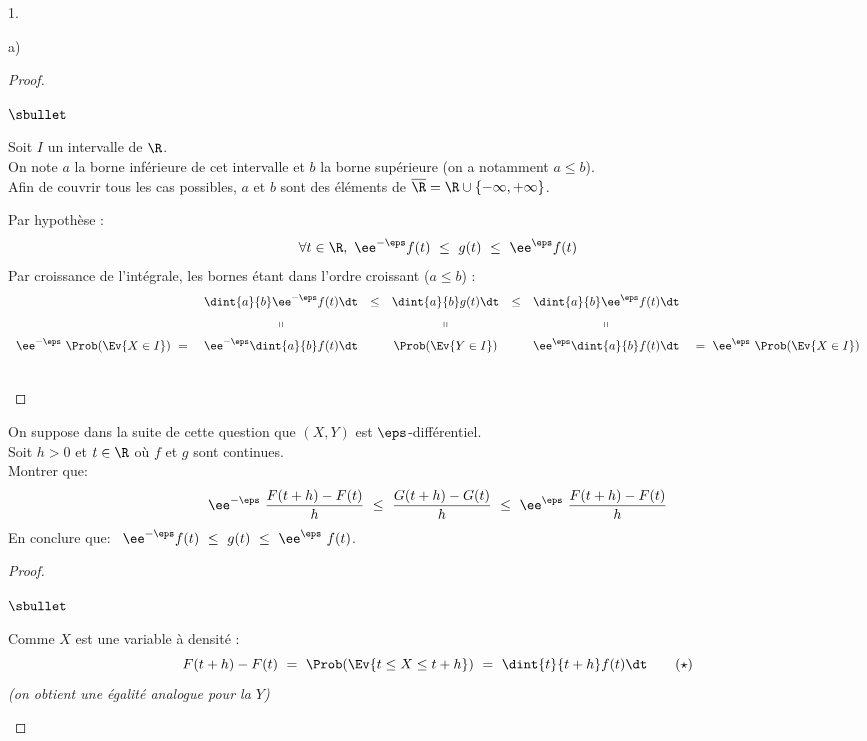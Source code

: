\documentclass[11pt]{article}%
\begin{document}
\begin{noliste}{1.}
\begin{noliste}{a)}
    \begin{proof}~%
      \begin{noliste}{$\sbullet$}
      \item Soit $I$ un intervalle de $\R$.\\
        On note $a$ la borne inférieure de cet intervalle et $b$ la
        borne supérieure (on a notamment $a \leq b$).\\
        Afin de couvrir tous les cas possibles, $a$ et $b$ sont des
        éléments de $\overline{\R} = \R \cup \{-\infty, +\infty\}$.
        
        
        
        

      \item Par hypothèse : 
        \[
        \forall t \in \R, \ \ee^{-\eps} f(t) \ \leq \ g(t) \ \leq \
        \ee^{\eps}f(t)
        \]
        Par croissance de l'intégrale, les bornes étant dans l'ordre
        croissant ($a \leq b$) :
        \[
        \begin{array}{rcccccl}
          & \dint{a}{b} \ee^{-\eps} f(t) \dt & \leq & \dint{a}{b} g(t) 
\dt
          & \leq & \dint{a}{b} \ee^{\eps} f(t) \dt &
          \\[.2cm]
          & \shortparallel & & \shortparallel & & \shortparallel
          \\[.2cm]
          \ee^{-\eps} \ \Prob(\Ev{X \in I}) \ = \ & \ee^{-\eps}
          \dint{a}{b}f(t) \dt & &  \Prob(\Ev{Y \in I}) & & \ee^{\eps}
          \dint{a}{b}f(t) \dt & \ = \ \ee^{\eps} \ \Prob(\Ev{X \in I})
        \end{array}
        \]        
      \end{noliste}
      ~\\[-1.2cm]
    \end{proof}

  \item On suppose dans la suite de cette question que $(X,Y)$ est
    $\eps$-différentiel.\\
    Soit $h>0$ et $t \in \R$ où $f$ et $g$ sont continues.\\[.2cm]
    Montrer que:
    \[
    \ee^{-\eps} \ \dfrac{F(t+h)-F(t)}{h} \ \leq \
    \dfrac{G(t+h)-G(t)}{h} \ \leq \ \ee^{\eps} \
    \dfrac{F(t+h)-F(t)}{h}
    \]
    En conclure que: \ $\ee^{-\eps} f(t) \ \leq \ g(t) \ \leq \
    \ee^{\eps} \ f(t)$.

    \begin{proof}~%
      \begin{noliste}{$\sbullet$}
      \item Comme $X$ est une variable à densité : 
        \[
        F(t+h)-F(t) \ = \ \Prob(\Ev{ t \leq X \leq t+h}) \ = \
        \dint{t}{t+h} f(t) \dt \qquad (\star)
        \]
        {\it (on obtient une égalité analogue pour la \var $Y$)}


\end{noliste}
\end{proof}
\end{noliste}
\end{noliste}
\end{document}
